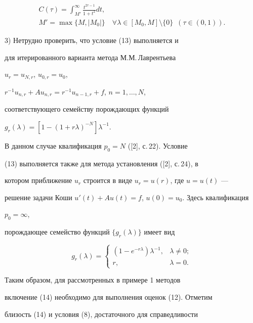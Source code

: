 \begin{exam}
\begin{gather*}
C(\tau)=\int^\infty_{M'}\frac{t^{2\tau-1}}{1+t^2}d t, \\ 


% 


M'=\max\{M,|M_0|\}\quad \forall\lambda\in[M_0,M]\setminus\{0\} 


\ \; (\tau\in(0,1)). 


\end{gather*} 


 


3) Нетрудно проверить, что условие (13) выполняется и 


для итерированного варианта метода М.М.\,Лаврентьева 


$u_r=u_{N,r}$, $u_{0,r}=u_0$, 


$r^{-1}u_{n,r}+Au_{n,r}=r^{-1}u_{n-1,r}+f$, $n=1,\dotsc,N$, 


соответствующего семейству порождающих функций 


$g_r(\lambda)=[1-(1+r\lambda)^{-N}]\lambda^{-1}$. 


В данном случае квалификация $p_0=N$ ([2], с.\,22). Условие 


(13) выполняется также для метода установления ([2], с.\,24), в 


котором приближение $u_r$ строится в виде $u_r=u(r)$, где $u=u(t)$ --- 


решение задачи Коши $u'(t)+Au(t)=f$, $u(0)=u_0$. Здесь квалификация 


$p_0=\infty$, 


порождающее семейство функций $\{g_r(\lambda)\}$ имеет вид 


$$ 


g_r(\lambda)= 


\begin{cases} 


(1-e^{-r\lambda})\lambda^{-1}, & \lambda\ne0;\\ 


r, &\lambda=0. 


\end{cases} 


$$ 


\end{exam} 


 


Таким образом, для рассмотренных в примере 1 методов 


включение (14) необходимо для выполнения оценок (12). Отметим 


близость (14) и условия (8), достаточного для справедливости 


